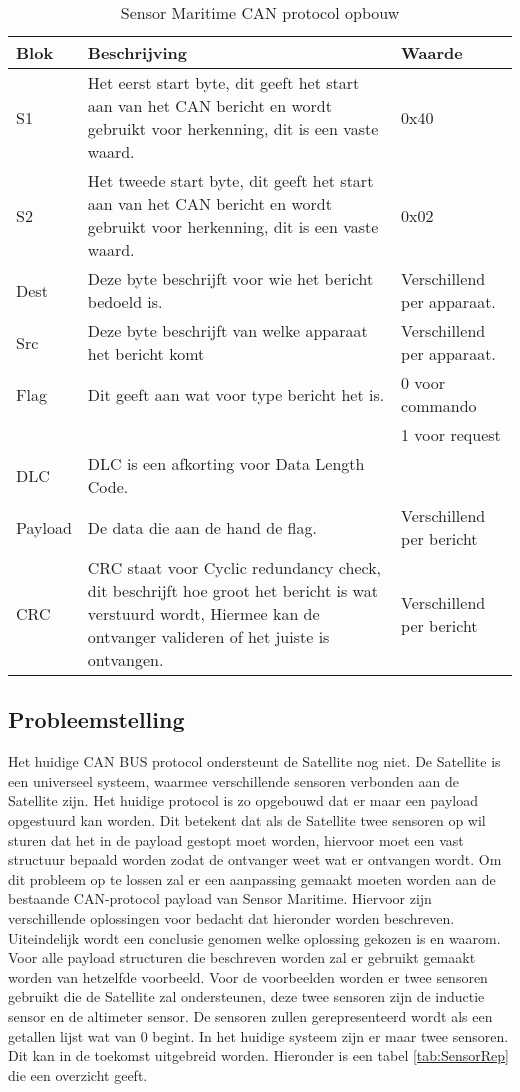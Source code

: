 \begin{table}[h!]
	\caption{Sensor Maritime CAN protocol opbouw}
	\label{tab:cansensorprotocol}
	\begin{tabular}{p{1.5cm}p{10.5cm}p{3cm}}
	\toprule
	\textbf{Blok} & \textbf{Beschrijving} & \textbf{Waarde}\\ \midrule
	S1		& Het eerst start byte, dit geeft het start aan van het CAN bericht en wordt gebruikt voor herkenning, dit is een vaste waard.	& 0x40 \\
	S2		& Het tweede start byte, dit geeft het start aan van het CAN bericht en wordt gebruikt voor herkenning, dit is een vaste waard. & 0x02 \\
	Dest	& Deze byte beschrijft voor wie het bericht bedoeld is.		& Verschillend per apparaat. \\
	Src		& Deze byte beschrijft van welke apparaat het bericht komt	& Verschillend per apparaat.\\ 
	Flag	& Dit geeft aan wat voor type bericht het is.             & 0 voor commando \\ 
			& & 1 voor request \\ 
	DLC		& DLC is een afkorting voor Data Length Code.             & \\ 
	Payload	& De data die aan de hand de flag. & Verschillend per bericht\\
	CRC		& CRC staat voor Cyclic redundancy check, dit beschrijft hoe groot het bericht is wat verstuurd wordt, Hiermee kan de ontvanger valideren of het juiste is ontvangen. & Verschillend per bericht\\ \bottomrule
	\end{tabular}
\end{table}

\subsection{Probleemstelling}
Het huidige CAN BUS protocol ondersteunt de Satellite nog niet. De Satellite is een universeel systeem, waarmee verschillende sensoren verbonden aan de Satellite zijn. Het huidige protocol is zo opgebouwd dat er maar een payload opgestuurd kan worden. Dit betekent dat als de Satellite twee sensoren op wil sturen dat het in de payload gestopt moet worden, hiervoor moet een vast structuur bepaald worden zodat de ontvanger weet wat er ontvangen wordt. Om dit probleem op te lossen zal er een aanpassing gemaakt moeten worden aan de bestaande CAN-protocol payload van Sensor Maritime. Hiervoor zijn verschillende oplossingen voor bedacht dat hieronder worden beschreven. Uiteindelijk wordt een conclusie genomen welke oplossing gekozen is en waarom. Voor alle payload structuren die beschreven worden zal er gebruikt gemaakt worden van hetzelfde voorbeeld. Voor de voorbeelden worden er twee sensoren gebruikt die de Satellite zal ondersteunen, deze twee sensoren zijn de inductie sensor en de altimeter sensor. De sensoren zullen gerepresenteerd wordt als een getallen lijst wat van 0 begint. In het huidige systeem zijn er maar twee sensoren. Dit kan in de toekomst uitgebreid worden. Hieronder is een tabel \ref{tab:SensorRep} die een overzicht geeft.

